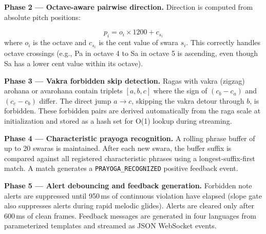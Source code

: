 \documentclass[12pt,a4paper]{report}
\numberwithin{equation}{chapter}
\begin{document}
\textbf{Phase 2 --- Octave-aware pairwise direction.} Direction is computed from absolute pitch positions:

\begin{equation}
p_i = o_i \times 1200 + c_{s_i}
\label{eq:pitch-pos}
\end{equation}
where $o_i$ is the octave and $c_{s_i}$ is the cent value of swara $s_i$. This correctly handles octave crossings (e.g., Pa in octave 4 to Sa in octave 5 is ascending, even though Sa has a lower cent value within its octave).

\textbf{Phase 3 --- Vakra forbidden skip detection.} Ragas with vakra (zigzag) arohana or avarohana contain triplets $[a, b, c]$ where the sign of $(c_b - c_a)$ and $(c_c - c_b)$ differ. The direct jump $a \to c$, skipping the vakra detour through $b$, is forbidden. These forbidden pairs are derived automatically from the raga scale at initialization and stored as a hash set for O(1) lookup during streaming.

\textbf{Phase 4 --- Characteristic prayoga recognition.} A rolling phrase buffer of up to 20 swaras is maintained. After each new swara, the buffer suffix is compared against all registered characteristic phrases using a longest-suffix-first match. A match generates a \texttt{PRAYOGA\_RECOGNIZED} positive feedback event.

\textbf{Phase 5 --- Alert debouncing and feedback generation.} Forbidden note alerts are suppressed until 950\,ms of continuous violation have elapsed (slope gate also suppresses alerts during rapid melodic glides). Alerts are cleared only after 600\,ms of clean frames. Feedback messages are generated in four languages from parameterized templates and streamed as JSON WebSocket events.
\end{document}
